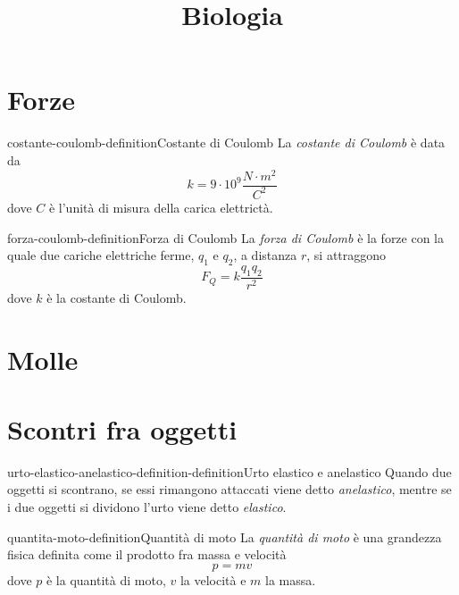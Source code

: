 \documentclass[preview]{standalone}
\begin{document}
\title{Biologia}
\genpage

\section{Forze}

\begin{snippetdefinition}{costante-coulomb-definition}{Costante di Coulomb}
    La \textit{costante di Coulomb} è data da
    \[
        k = 9 \cdot 10^9 \frac{N \cdot m^2}{C^2} 
    \]
    dove \(C\) è l'unità di misura della carica elettrictà.
\end{snippetdefinition}

\begin{snippetdefinition}{forza-coulomb-definition}{Forza di Coulomb}
    La \textit{forza di Coulomb} è la forze con la quale due cariche elettriche ferme,
    \(q_1\) e \(q_2\), a distanza \(r\), si attraggono
    \[
        F_Q = k \frac{q_1 q_2}{r^2}
    \]
    dove \(k\) è la costante di Coulomb.
\end{snippetdefinition}

\section{Molle}



\section{Scontri fra oggetti}

\begin{snippetdefinition}{urto-elastico-anelastico-definition-definition}{Urto elastico e anelastico}
    Quando due oggetti si scontrano, se essi rimangono
    attaccati viene detto \textit{anelastico}, mentre se i due oggetti
    si dividono l'urto viene detto \textit{elastico}.
\end{snippetdefinition}

\begin{snippetdefinition}{quantita-moto-definition}{Quantità di moto}
    La \textit{quantità di moto} è una grandezza fisica definita come il prodotto fra
    massa e velocità
    \[
        p = mv
    \]
    dove \(p\) è la quantità di moto, \(v\) la velocità e \(m\) la massa.
\end{snippetdefinition}
\end{document}
